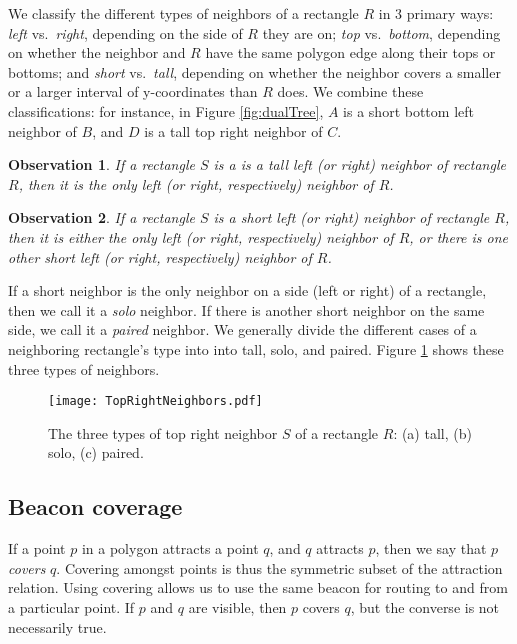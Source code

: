 \documentclass{article}
\newtheorem{obs}{Observation}
\begin{document}
			
			We classify the different types of neighbors of a rectangle $R$ in 3 primary
			ways:  \emph{left} vs.\  \emph{right}, depending on the side of $R$ they are
			on; \emph{top} vs.\  \emph{bottom}, depending on whether the neighbor and $R$
			have the same polygon edge along their tops or bottoms; and \emph{short} vs.\ 
			\emph{tall}, depending on whether the neighbor 
			covers a smaller or a larger interval of y-coordinates than $R$ does.
			We combine these classifications: for instance, in Figure \ref{fig:dualTree},
			$A$ is a short bottom left neighbor of $B$, and $D$ is a tall top right neighbor of
			$C$.
		
		\begin{obs}
			If a rectangle $S$ is a is a tall left (or right) neighbor of rectangle $R$,
			then it is the \emph{only} left (or right, respectively) neighbor of $R$.
		\end{obs}
		
		\begin{obs}
			If a rectangle $S$ is a short left (or right) neighbor of rectangle $R$, then
			it is either the \emph{only} left (or right, respectively) neighbor of $R$, 
			or there is one other short left (or right, respectively) neighbor of $R$.
		\end{obs}
		
		If a short neighbor is the only neighbor on a side (left or right) of a
		rectangle, then we call it a \emph{solo} neighbor.  If there is another short
		neighbor on the same side, we call it a \emph{paired} neighbor.
		We generally divide the different cases of a neighboring rectangle's type into
		into tall, solo, and paired.
		Figure \ref{fig:topRight} shows these three types of neighbors.
		 
		\begin{figure}[htbp] 
			\begin{center}
				\texttt{[image: TopRightNeighbors.pdf]} 
			\end{center}
			\caption{
				The three types of top right neighbor $S$ of a rectangle $R$:
				(a) tall, (b) solo, (c) paired. 
			}
			\label{fig:topRight} 
		\end{figure}
		

		
	\subsection{Beacon coverage}\label{sec:coverage}
	
		If a point $p$ in a polygon attracts a point $q$, and $q$ attracts $p$, then we
		say that $p$ \emph{covers} $q$.
		Covering amongst points is thus the symmetric subset of the attraction
		relation.
		Using covering allows us to use the same beacon for routing to and from a
		particular point.  If $p$ and $q$ are visible, then $p$ covers $q$, but the
		converse is not necessarily true.
\end{document}
